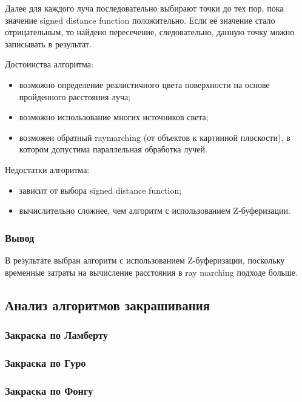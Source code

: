 Далее для каждого луча последовательно выбирают точки до тех пор, пока значение signed distance function положительно. Если её значение стало отрицательным, то найдено пересечение, следовательно, данную точку можно записывать в результат.

Достоинства алгоритма:
\begin{itemize}
    \item возможно определение реалистичного цвета поверхности на основе пройденного расстояния луча;
    \item возможно использование многих источников света;
    \item возможен обратный raymarching (от объектов к картинной плоскости), в котором допустима параллельная обработка лучей.
\end{itemize}

Недостатки алгоритма:
\begin{itemize}
    \item зависит от выбора signed distance function;
    \item вычислительно сложнее, чем алгоритм с использованием Z-буферизации\cite{site:raymarching}.
\end{itemize}

\subsubsection{Вывод}

В результате выбран алгоритм с использованием Z-буферизации, поскольку временные
затраты на вычисление расстояния в ray marching подходе больше.

\subsection{Анализ алгоритмов закрашивания}

\subsubsection{Закраска по Ламберту}

\subsubsection{Закраска по Гуро}

\subsubsection{Закраска по Фонгу}

